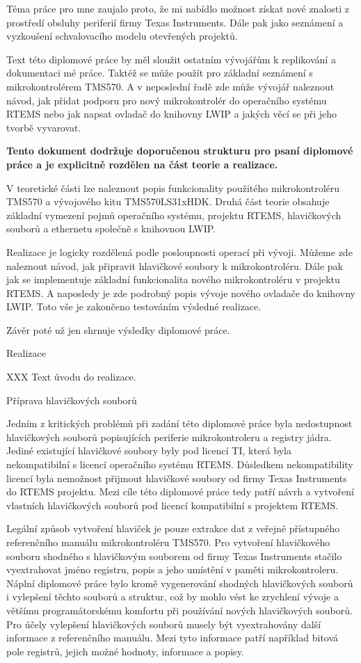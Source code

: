Téma práce pro mne zaujalo proto, že mi nabídlo možnost získat nové znalosti z prostředí obsluhy periferií firmy Texas Instruments.
Dále pak jako seznámení a vyzkoušení schvalovacího modelu otevřených projektů.

Text této diplomové práce by měl sloužit ostatním vývojářům k replikování a dokumentaci mé práce.
Taktéž se může použít pro základní seznámení s mikrokontrolérem TMS570.
A v neposlední řadě zde může vývojář naleznout návod, jak přidat podporu pro nový mikrokontrolér do operačního systému RTEMS nebo jak napsat ovladač do knihovny LWIP a jakých věcí se při jeho tvorbě vyvarovat.   

\medskip

{\bf
Tento dokument dodržuje doporučenou strukturu pro psaní diplomové práce a je explicitně rozdělen na část teorie a realizace.

V teoretické části lze naleznout popis funkcionality použitého mikrokontroléru TMS570 a vývojového kitu TMS570LS31xHDK.
Druhá část teorie obsahuje základní vymezení pojmů operačního systému, projektu RTEMS, hlavičkových souborů a ethernetu společně s knihovnou LWIP.

Realizace je logicky rozdělená podle posloupnosti operací při vývoji.
Můžeme zde naleznout návod, jak připravit hlavičkové soubory k mikrokontroléru.
Dále pak jak se implementuje základní funkcionalita nového mikrokontroléru v projektu RTEMS.
A naposledy je zde podrobný popis vývoje nového ovladače do knihovny LWIP.
Toto vše je zakončeno testováním výsledné realizace.

Závěr poté už jen shrnuje výsledky diplomové práce.}


\chap Realizace

XXX Text úvodu do realizace.

\sec Příprava hlavičkových souborů

	Jedním z kritických problémů při zadání této diplomové práce byla nedostupnost hlavičkových souborů popisujících periferie mikrokontroleru a registry jádra.
Jediné existující hlavičkové soubory byly pod licencí TI, která byla nekompatibilní s licencí operačního systému RTEMS.
Důsledkem nekompatibility licencí byla nemožnost přijmout hlavičkové soubory od firmy Texas Instruments do RTEMS projektu.
Mezi cíle této diplomové práce tedy patří návrh a vytvoření vlastních hlavičkových souborů pod licencí kompatibilní s projektem RTEMS.

Legální způsob vytvoření hlaviček je pouze extrakce dat z veřejně přístupného referenčního manuálu mikrokontroléru TMS570.
Pro vytvoření hlavičkového souboru shodného s hlavičkovým souborem od firmy Texas Instruments stačilo vyextrahovat jméno registru, popis a jeho umístění v paměti mikrokontroleru.
Náplní diplomové práce bylo kromě vygenerování shodných hlavičkových souborů i vylepšení těchto souborů a struktur, což by mohlo vést ke zrychlení vývoje a většímu programátorskému komfortu při používání nových hlavičkových souborů.
Pro účely vylepšení hlavičkových souborů musely být vyextrahovány další informace z referenčního manuálu.
Mezi tyto informace patří například bitová pole registrů, jejich možné hodnoty, informace a popisy.

